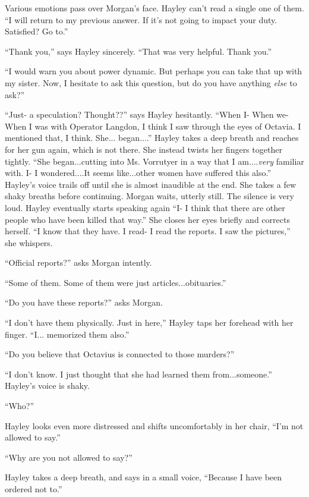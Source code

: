 Various emotions pass over Morgan's face.  Hayley can't read a single one of them. ``I will return to my previous answer.  If it's not going to impact your duty.  Satisfied?  Go to.''

``Thank you,'' says Hayley sincerely.  ``That was very helpful.  Thank you.''

``I would warn you about power dynamic.  But perhaps you can take that up with my sister.  Now, I hesitate to ask this question, but do you have anything \textit{else} to ask?''



``Just- a speculation?  Thought??'' says Hayley hesitantly.  ``When I-  When we- When I was with Operator Langdon, I think I saw through the eyes of Octavia.  I mentioned that, I think. She... began....''  Hayley takes a deep breath and reaches for her gun again, which is not there.  She instead twists her fingers together tightly.  ``She began...cutting into Ms. Vorrutyer in a way that I am....\textit{very} familiar with.  I- I wondered....It seems like...other women have suffered this also.''  Hayley's voice trails off until she is almost inaudible at the end.  She takes a few shaky breaths before continuing.  Morgan waits, utterly still.  The silence is very loud.  Hayley eventually starts speaking again ``I- I think that there are other people who have been killed that way.''  She closes her eyes briefly and corrects herself.  ``I know that they have.  I read- I read the reports.  I saw the pictures,'' she whispers.

``Official reports?'' asks Morgan intently.

``Some of them.  Some of them were just articles...obituaries.''

``Do you have these reports?'' asks Morgan.

``I don't have them physically.  Just in here,'' Hayley taps her forehead with her finger. ``I... memorized them also.''

``Do you believe that Octavius is connected to those murders?''

``I don't know.  I just thought that she had learned them from...someone.'' Hayley's voice is shaky.

``Who?''

Hayley looks even more distressed and shifts uncomfortably in her chair, ``I'm not allowed to say.''

``Why are you not allowed to say?''

Hayley takes a deep breath, and says in a small voice, ``Because I have been ordered not to.''

